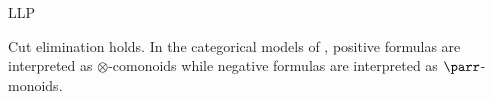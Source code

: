 \begin{entry}{LLP}
\begin{technicalities}
Cut elimination holds.
In the categorical models of \LL, positive formulas are interpreted as $\otimes$-comonoids while negative formulas are interpreted as $\parr$-monoids.
\end{technicalities}



%
%
%
%
%
%
% 
%












\end{entry}



